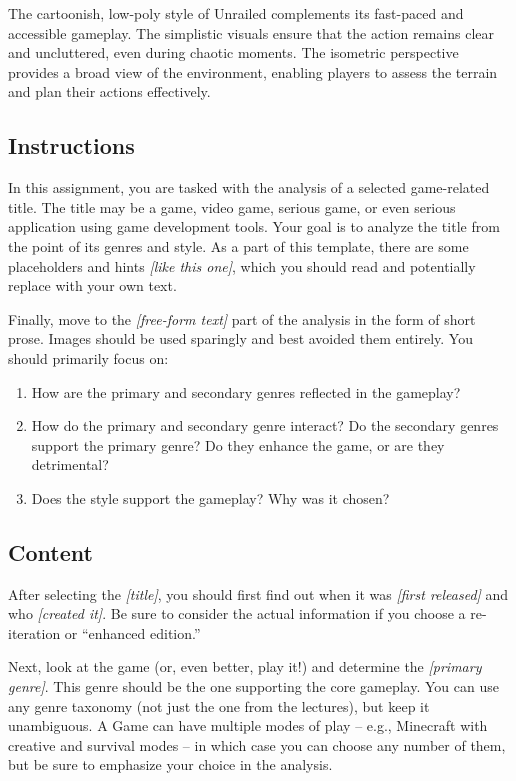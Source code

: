 \documentclass[a4paper,10pt,english]{article}
\newcommand{\ph}[1]{\textit{[#1]}}
\begin{document}
The cartoonish, low-poly style of Unrailed complements its fast-paced and accessible gameplay. The simplistic visuals ensure that the action remains clear and uncluttered, even during chaotic moments. The isometric perspective provides a broad view of the environment, enabling players to assess the terrain and plan their actions effectively.


\subsection*{Instructions}

In this assignment, you are tasked with the analysis of a selected game-related title. The title may be a game, video game, serious game, or even serious application using game development tools. Your goal is to analyze the title from the point of its genres and style. As a part of this template, there are some placeholders and hints \ph{like this one}, which you should read and potentially replace with your own text.

Finally, move to the \ph{free-form text} part of the analysis in the form of short prose. Images should be used sparingly and best avoided them entirely. You should primarily focus on: 
\begin{enumerate}
    \item How are the primary and secondary genres reflected in the gameplay?
    \item How do the primary and secondary genre interact? Do the secondary genres support the primary genre? Do they enhance the game, or are they detrimental?
    \item Does the style support the gameplay? Why was it chosen?
\end{enumerate}

\subsection*{Content}

After selecting the \ph{title}, you should first find out when it was \ph{first released} and who \ph{created it}. Be sure to consider the actual information if you choose a re-iteration or ``enhanced edition.'' 

Next, look at the game (or, even better, play it!) and determine the \ph{primary genre}. This genre should be the one supporting the core gameplay. You can use any genre taxonomy (not just the one from the lectures), but keep it unambiguous. A Game can have multiple modes of play -- e.g., Minecraft with creative and survival modes -- in which case you can choose any number of them, but be sure to emphasize your choice in the analysis.
\end{document}
